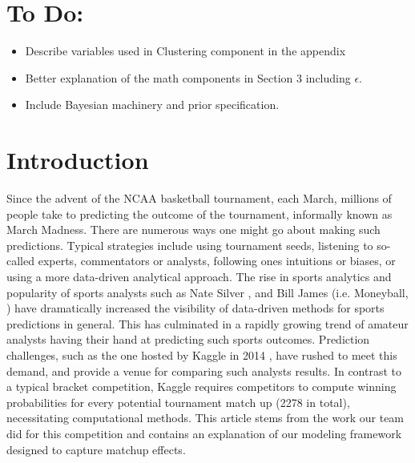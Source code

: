 \documentclass[letterpaper,12pt]{article}
\begin{document}
\section*{To Do:}
\begin{itemize}
\item Describe variables used in Clustering component in the appendix
\item Better explanation of the math components in Section 3 including $\epsilon$.
\item Include Bayesian machinery and prior specification.
\end{itemize}
\newpage

\section{Introduction}
Since the advent of the NCAA basketball tournament, each March, millions of people take to predicting the outcome of the tournament, informally known as March Madness. There are numerous ways one might go about making such predictions. Typical strategies include using tournament seeds, listening to so-called experts, commentators or analysts, following ones intuitions or biases, or using a more data-driven analytical approach. 
The rise in sports analytics and  popularity of sports analysts such as Nate Silver \citep{silver}, and Bill James (i.e. Moneyball, \citep{james, moneyball}) have dramatically increased the visibility of data-driven methods for sports predictions in general. This has culminated in a rapidly growing trend of amateur analysts having their hand at predicting such sports outcomes. 
Prediction challenges, such as the one hosted by Kaggle in 2014 \citep{kaggle}, have rushed to meet this demand, and provide a venue for comparing such analysts results. 
In contrast to a typical bracket competition, Kaggle requires competitors to compute winning probabilities for every potential tournament match up (2278 in total), necessitating computational methods. This article stems from the work our team did for this competition and contains an explanation of our modeling framework designed to capture matchup effects. 
\end{document}
